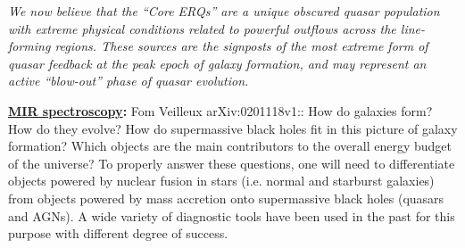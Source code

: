 \smallskip
\smallskip
\noindent
{\it We now believe that the ``Core ERQs'' are a unique obscured quasar population
with extreme physical conditions related to powerful outflows across
the line-forming regions. These sources are the signposts of the most extreme form of
quasar feedback at the peak epoch of galaxy formation, and may
represent an active ``blow-out'' phase of quasar evolution. 
}


\medskip
\medskip
\smallskip
\smallskip
\noindent
{\bf \underline{MIR spectroscopy}:}
Fom Veilleux arXiv:0201118v1:: 
How do galaxies form? How do they evolve? How do supermassive black holes fit in this picture of galaxy formation? Which objects are the main contributors to the overall energy budget of the universe? To properly answer these questions, one will need to differentiate objects powered by nuclear fusion in stars (i.e. normal and starburst galaxies) from objects powered by mass accretion onto supermassive black holes (quasars and AGNs). A wide variety of diagnostic tools have been used in the past for this purpose with different degree of success.

\iffalse
Direct spectroscopy searches for the presence of the broad recombination lines at wavelengths where the effects of dust extinction are reduced.
We follow ``Veilleux's Commandments'':
\begin{itemize}
\item Thou shalt use lines which emphasize the differences between H II regions and AGNs; i.e., use high-ionization lines or low-ionization lines produced in the partially ionized zone. 
\item Thou shalt use strong lines which are easy to measure in typical spectra.
\item Thou shalt avoid lines which are badly blended with other emission or absorption line features.
\item Thou shalt use lines with small wavelength separation to minimize sensitivity to reddening.
\item Thou shalt use line ratios from the same elements or involving hydrogen recombination lines to eliminate or reduce abundance dependence.
\item Thou shalt avoid lines from Mg, Si, Ca, Fe – depleted onto dust grains. 
\item Thou shalt avoid lines affected by strong stellar absorption features. 
\item Thou shalt avoid lines affected by strong atmospheric features.
\item Thou shalt use lines at long wavelengths to reduce the effects of dust extinction.
\end{itemize}
\fi

